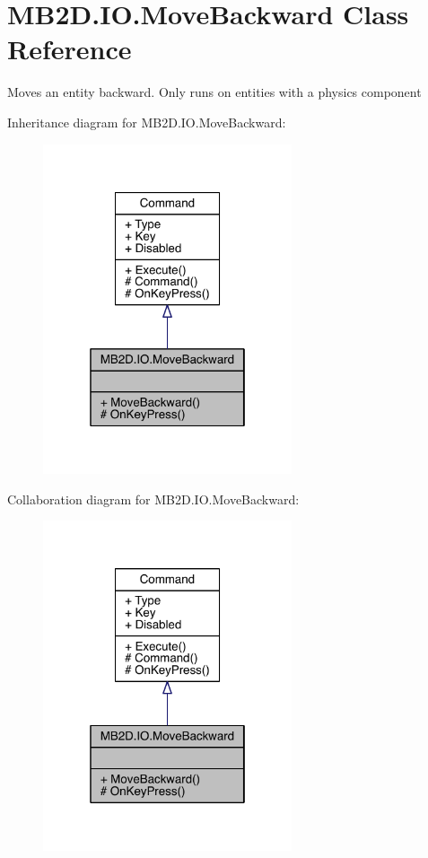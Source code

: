 \hypertarget{class_m_b2_d_1_1_i_o_1_1_move_backward}{}\section{M\+B2\+D.\+I\+O.\+Move\+Backward Class Reference}
\label{class_m_b2_d_1_1_i_o_1_1_move_backward}


Moves an entity backward. Only runs on entities with a physics component  




Inheritance diagram for M\+B2\+D.\+I\+O.\+Move\+Backward\+:\nopagebreak
\begin{figure}[H]
\begin{center}
\leavevmode
\includegraphics[width=208pt]{class_m_b2_d_1_1_i_o_1_1_move_backward__inherit__graph}
\end{center}
\end{figure}


Collaboration diagram for M\+B2\+D.\+I\+O.\+Move\+Backward\+:\nopagebreak
\begin{figure}[H]
\begin{center}
\leavevmode
\includegraphics[width=208pt]{class_m_b2_d_1_1_i_o_1_1_move_backward__coll__graph}
\end{center}
\end{figure}
